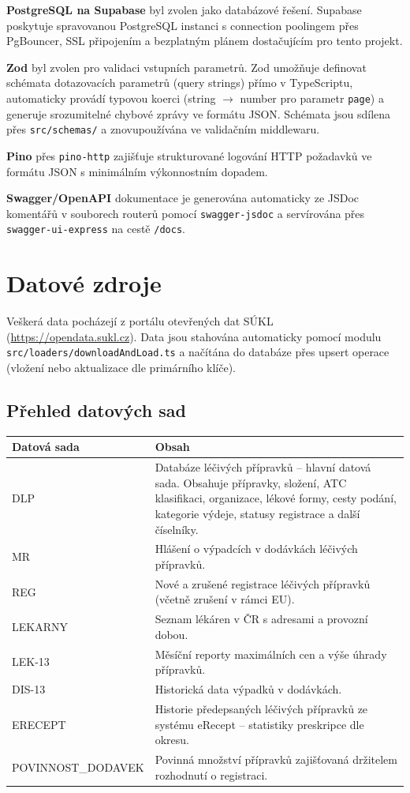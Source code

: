 \documentclass[12pt,a4paper]{article}
\begin{document}
\textbf{PostgreSQL na Supabase} byl zvolen jako databázové řešení. Supabase poskytuje spravovanou PostgreSQL instanci s connection poolingem přes PgBouncer, SSL připojením a bezplatným plánem dostačujícím pro tento projekt.

\textbf{Zod} byl zvolen pro validaci vstupních parametrů. Zod umožňuje definovat schémata dotazovacích parametrů (query strings) přímo v TypeScriptu, automaticky provádí typovou koerci (string \(\to\) number pro parametr \texttt{page}) a generuje srozumitelné chybové zprávy ve formátu JSON. Schémata jsou sdílena přes \texttt{src/schemas/} a znovupoužívána ve validačním middlewaru.

\textbf{Pino} přes \texttt{pino-http} zajišťuje strukturované logování HTTP požadavků ve formátu JSON s minimálním výkonnostním dopadem.

\textbf{Swagger/OpenAPI} dokumentace je generována automaticky ze JSDoc komentářů v souborech routerů pomocí \texttt{swagger-jsdoc} a servírována přes \texttt{swagger-ui-express} na cestě \texttt{/docs}.

\section{Datové zdroje}

Veškerá data pocházejí z portálu otevřených dat SÚKL (\url{https://opendata.sukl.cz}). Data jsou stahována automaticky pomocí modulu \texttt{src/loaders/downloadAndLoad.ts} a načítána do databáze přes upsert operace (vložení nebo aktualizace dle primárního klíče).

\subsection{Přehled datových sad}

\begin{longtable}{@{}lp{7cm}@{}}
\toprule
\textbf{Datová sada} & \textbf{Obsah} \\
\midrule
\endhead
DLP & Databáze léčivých přípravků -- hlavní datová sada. Obsahuje přípravky, složení, ATC klasifikaci, organizace, lékové formy, cesty podání, kategorie výdeje, statusy registrace a další číselníky. \\[0.5em]
MR & Hlášení o výpadcích v dodávkách léčivých přípravků. \\[0.5em]
REG & Nové a zrušené registrace léčivých přípravků (včetně zrušení v rámci EU). \\[0.5em]
LEKARNY & Seznam lékáren v ČR s adresami a provozní dobou. \\[0.5em]
LEK-13 & Měsíční reporty maximálních cen a výše úhrady přípravků. \\[0.5em]
DIS-13 & Historická data výpadků v dodávkách. \\[0.5em]
ERECEPT & Historie předepsaných léčivých přípravků ze systému eRecept -- statistiky preskripce dle okresu. \\[0.5em]
POVINNOST\_DODAVEK & Povinná množství přípravků zajišťovaná držitelem rozhodnutí o registraci. \\
\bottomrule
\end{longtable}
\end{document}
